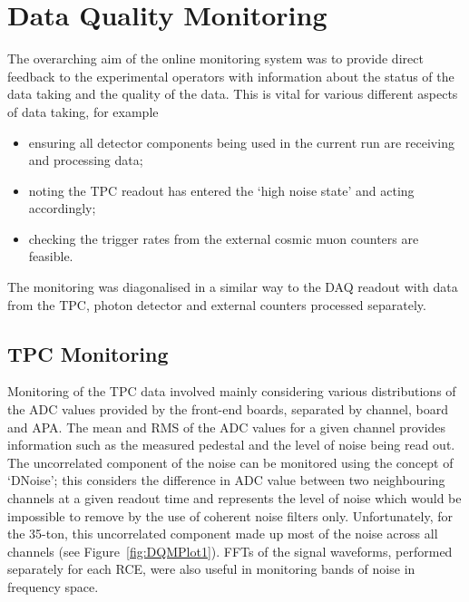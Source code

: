 \section{Data Quality Monitoring}\label{sec:DQM}

The overarching aim of the online monitoring system was to provide direct feedback to the experimental operators with information about the status of the data taking and the quality of the data.  This is vital for various different aspects of data taking, for example
\begin{itemize}
\item ensuring all detector components being used in the current run are receiving and processing data;
\item noting the TPC readout has entered the `high noise state' and acting accordingly;
\item checking the trigger rates from the external cosmic muon counters are feasible.
\end{itemize}

The monitoring was diagonalised in a similar way to the DAQ readout with data from the TPC, photon detector and external counters processed separately.

\subsection{TPC Monitoring}\label{sec:TPCMonitoring}

Monitoring of the TPC data involved mainly considering various distributions of the ADC values provided by the front-end boards, separated by channel, board and APA.  The mean and RMS of the ADC values for a given channel provides information such as the measured pedestal and the level of noise being read out.  The uncorrelated component of the noise can be monitored using the concept of `DNoise'; this considers the difference in ADC value between two neighbouring channels at a given readout time and represents the level of noise which would be impossible to remove by the use of coherent noise filters only.  Unfortunately, for the 35-ton, this uncorrelated component made up most of the noise across all channels (see Figure~\ref{fig:DQMPlot1}).  FFTs of the signal waveforms, performed separately for each RCE, were also useful in monitoring bands of noise in frequency space.

